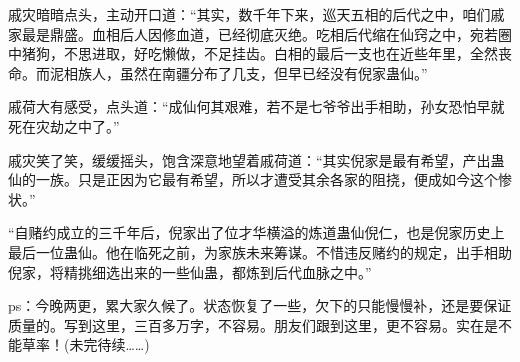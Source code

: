 \begin{this_body}
戚灾暗暗点头，主动开口道：“其实，数千年下来，巡天五相的后代之中，咱们戚家最是鼎盛。血相后人因修血道，已经彻底灭绝。吃相后代缩在仙窍之中，宛若圈中猪狗，不思进取，好吃懒做，不足挂齿。白相的最后一支也在近些年里，全然丧命。而泥相族人，虽然在南疆分布了几支，但早已经没有倪家蛊仙。”

戚荷大有感受，点头道：“成仙何其艰难，若不是七爷爷出手相助，孙女恐怕早就死在灾劫之中了。”

戚灾笑了笑，缓缓摇头，饱含深意地望着戚荷道：“其实倪家是最有希望，产出蛊仙的一族。只是正因为它最有希望，所以才遭受其余各家的阻挠，便成如今这个惨状。”

“自赌约成立的三千年后，倪家出了位才华横溢的炼道蛊仙倪仁，也是倪家历史上最后一位蛊仙。他在临死之前，为家族未来筹谋。不惜违反赌约的规定，出手相助倪家，将精挑细选出来的一些仙蛊，都炼到后代血脉之中。”

ps：今晚两更，累大家久候了。状态恢复了一些，欠下的只能慢慢补，还是要保证质量的。写到这里，三百多万字，不容易。朋友们跟到这里，更不容易。实在是不能草率！(未完待续……)

\end{this_body}


